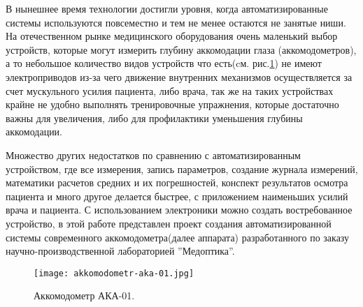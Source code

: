 В нынешнее время технологии достигли уровня, когда автоматизированные системы используются повсеместно и тем не менее остаются не занятые ниши. На отечественном рынке медицинского оборудования очень маленький выбор устройств, которые могут измерить глубину аккомодации глаза (аккомодометров), а то небольшое количество видов устройств что есть(cм. рис.\ref{fig:aka-01}) не имеют электроприводов из-за чего движение внутренних механизмов осуществляется за счет мускульного усилия пациента, либо врача, так же на таких устройствах крайне не удобно выполнять тренировочные упражнения, которые достаточно важны для увеличения, либо для профилактики уменьшения глубины аккомодации.

Множество других недостатков по сравнению с автоматизированным устройством, где все измерения, запись параметров, создание журнала измерений, математики расчетов средних и их погрешностей, конспект результатов осмотра пациента и много другое делается быстрее, с приложением наименьших усилий врача и пациента. С использованием электроники можно создать востребованное устройство, в этой работе представлен проект создания автоматизированной системы современного аккомодометра(далее аппарата) разработанного по заказу научно-производственной лабораторией ''Медоптика''.
\begin{figure}[ht]
    \centering
    \texttt{[image: akkomodometr-aka-01.jpg]}
    \caption{Аккомодометр АКА-01.}
    \label{fig:aka-01}
\end{figure}	